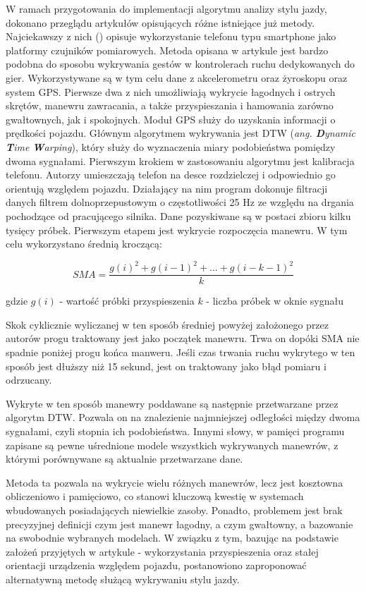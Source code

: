 W ramach przygotowania do implementacji algorytmu analizy stylu jazdy, dokonano przeglądu artykułów opisujących różne istniejące już metody. Najciekawszy z nich (\cite{driving_analysis_article}) opisuje wykorzystanie telefonu typu smartphone jako platformy czujników pomiarowych. Metoda opisana w artykule jest bardzo podobna do sposobu wykrywania gestów w kontrolerach ruchu dedykowanych do gier.  Wykorzystywane są w tym celu dane z akcelerometru oraz żyroskopu oraz system GPS. Pierwsze dwa z nich umożliwiają wykrycie łagodnych i ostrych skrętów, manewru zawracania, a także przyspieszania i hamowania zarówno gwałtownych, jak i spokojnych. Moduł GPS służy do uzyskania informacji o prędkości pojazdu. Głównym algorytmem wykrywania jest DTW (\textit{ang. \textbf{D}ynamic \textbf{T}ime \textbf{W}arping}), który służy do wyznaczenia miary podobieństwa pomiędzy dwoma sygnałami. 
Pierwszym krokiem w zastosowaniu algorytmu jest kalibracja telefonu. Autorzy umieszczają telefon na desce rozdzielczej i odpowiednio go orientują względem pojazdu. Działający na nim program dokonuje filtracji danych filtrem dolnoprzepustowym o częstotliwości 25 Hz ze względu na drgania pochodzące od pracującego silnika. Dane pozyskiwane są w postaci zbioru kilku tysięcy próbek. 
Pierwszym etapem jest wykrycie rozpoczęcia manewru. W tym celu wykorzystano średnią kroczącą:

\begin{equation}
	SMA = \frac{g(i)^2 + g(i-1)^2 + ... + g(i-k-1)^2}{k}
\end{equation}

gdzie
$g(i)$ - wartość próbki przyspieszenia
$k$ - liczba próbek w oknie sygnału

Skok cyklicznie wyliczanej w ten sposób średniej powyżej założonego przez autorów progu traktowany jest jako początek manewru. Trwa on dopóki SMA nie spadnie poniżej progu końca manweru. Jeśli czas trwania ruchu wykrytego w ten sposób jest dłuższy niż 15 sekund, jest on traktowany jako błąd pomiaru i odrzucany.

Wykryte w ten sposób manewry poddawane są następnie przetwarzane przez algorytm DTW. Pozwala on na znalezienie najmniejszej odległości między dwoma sygnałami, czyli stopnia ich podobieństwa. Innymi słowy, w pamięci programu zapisane są pewne uśrednione modele wszystkich wykrywanych manewrów, z którymi porównywane są aktualnie przetwarzane dane. 

Metoda ta pozwala na wykrycie wielu różnych manewrów, lecz jest kosztowna obliczeniowo i pamięciowo, co stanowi kluczową kwestię w systemach wbudowanych posiadających niewielkie zasoby. Ponadto, problemem jest brak precyzyjnej definicji czym jest manewr łagodny, a czym gwałtowny, a bazowanie na swobodnie wybranych modelach.  W związku z tym, bazując na podstawie założeń przyjętych w artykule \cite{driving_analysis_article} - wykorzystania przyspieszenia oraz stałej orientacji urządzenia względem pojazdu, postanowiono zaproponować alternatywną metodę służącą wykrywaniu stylu jazdy.

